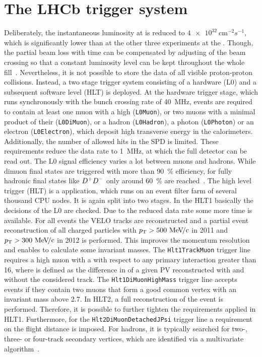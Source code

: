 
\section{The LHCb trigger system}
\label{sec:detector:trigger}

Deliberately, the instantaneous luminosity at \lhcb is reduced to
$\SI{4e32}{\cm^{-2}s^{-1}}$, which is significantly lower than at the other
three experiments at the \lhc. Though, the partial beam loss with time can be
compensated by adjusting of the beam crossing so that a constant luminosity
level can be kept throughout the whole fill~\cite{Alemany-Fernandez:2013bya}.
Nevertheless, it is not possible to store the data of all visible
proton-proton collisions. Instead, a two stage trigger system consisting of a
hardware (L0) and a subsequent software level (HLT) is deployed. At the
hardware trigger stage, which runs synchronously with the bunch crossing rate
of \SI{40}{\mega\hertz}, events are required to contain at least one muon with
a high \pt (\texttt{L0Muon}), or two muons with a minimal product of their \pT
(\texttt{L0DiMuon}), or a hadron (\texttt{L0Hadron}), a photon
(\texttt{L0Photon}) or an electron (\texttt{L0Electron}), which deposit high
transverse energy in the calorimeters. Additionally, the number of allowed
hits in the SPD is limited. These requirements reduce the data rate to
\SI{1}{\mega\hertz}, at which the full detector can be read out. The L0 signal
efficiency varies a lot between muons and hadrons. While dimuon final states
are triggered with more than \SI{90}{\percent} efficiency, for fully hadronic
final states like ${{D}^+}{{D}^-}$ only around \SI{60}{\percent} are
reached~\cite{LHCb-DP-2012-004,TriggerPerformance2012}. The high level trigger
(HLT) is a \cpp application, which runs on an event filter farm of several
thousand CPU nodes. It is again split into two stages. In the HLT1 basically
the decisions of the L0 are checked. Due to the reduced data rate some more
time is available. For all events the VELO tracks are reconstructed and a
partial event reconstruction of all charged particles with $\mbox{$p_{\mathrm{ T}}$} >
\SI{500}{\ensuremath{{\mathrm{\,Me\kern -0.1em V\!/}c}}}$ in 2011 and $\mbox{$p_{\mathrm{ T}}$} > \SI{300}{\ensuremath{{\mathrm{\,Me\kern -0.1em V\!/}c}}}$ in 2012 is performed.
This improves the momentum resolution and enables to calculate some invariant
masses. The \texttt{Hlt1TrackMuon} trigger line requires a high \pt muon with
a \chisqip with respect to any primary interaction greater than 16, where
\chisqip is defined as the difference in \chisq of a given PV reconstructed
with and without the considered track. %
The \texttt{Hlt1DiMuonHighMass} trigger line accepts events if they contain
two muons that form a good common vertex with an invariant mass above
\SI{2.7}{\gevcc}. In HLT2, a full reconstruction of the event is performed.
Therefore, it is possible to further tighten the requirements applied in HLT1.
Furthermore, for the \texttt{Hlt2DiMuonDetachedJPsi} trigger line a
requirement on the flight distance is imposed. For hadrons, it is typically
searched for two-, three- or four-track secondary vertices, which are
identified via a multivariate algorithm~\cite{BBDT}.


